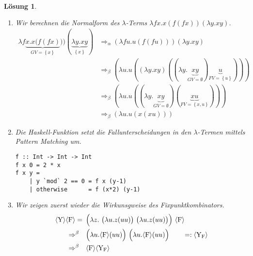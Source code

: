 \documentclass[ngerman,a4paper, 11pt]{scrartcl}
\newcommand{\menge}[1]{\ensuremath{\left\{ #1 \right\}}}
\newcommand{\num}[1]{\ensuremath{\langle \mathrm{#1} \rangle}}
\theoremstyle{break}
\theoremstyle{nonumberplain}
\newtheorem{solution}{Lösung}
\begin{document}
\begin{solution}
	\begin{enumerate}[label=(\alph*), leftmargin=*, nolistsep]
		\item Wir berechnen die Normalform des $\lambda$-Terms $\lambda f x.x(f(fx)) (\lambda y. xy)$.
		\begin{align*}
		\lambda f \underbrace{x.x(f(fx)}_{GV=\menge{x}})) (\underbrace{\lambda y. xy}_{\menge{x}}) 
		&\Rightarrow_\alpha  
		(\lambda f u.u(f(fu))) (\lambda y. xy) \\
		&\Rightarrow_\beta
		(\lambda u.u((\lambda y. xy)((\lambda y. \underbrace{xy}_{GV = \emptyset})\underbrace{u}_{FV = \menge{u}}))) \\
		&\Rightarrow_\beta
		(\lambda u.u((\lambda y. \underbrace{xy}_{GV = \emptyset})(\underbrace{xu}_{FV = \menge{x,u}}) )) \\
		&\Rightarrow_\beta
		(\lambda u . u(x(xu)))
		\end{align*}
		\item Die Haskell-Funktion setzt die Fallunterscheidungen in den $\lambda$-Termen mittels Pattern Matching um.
		
\begin{lstlisting}[style=haskell]
f :: Int -> Int -> Int
f x 0 = 2 * x
f x y = 
	| y `mod` 2 == 0 = f x (y-1)
	| otherwise      = f (x*2) (y-1)
\end{lstlisting}
		
		\item Wir zeigen zuerst wieder die Wirkunsgweise des Fixpunktkombinators.
		\begin{equation*}
		\begin{aligned}
		\num{Y} \num{F}
		= \enskip &\Bigl( \lambda z . \ \bigl( \lambda u . z (uu) \bigr) \ \bigl( \lambda u. z (uu) \bigr) \Bigr) \ \num{F} \\
		\Rightarrow^{\beta} \quad &\Bigl( \lambda u . \num{F} (uu) \Bigr) \ \Bigl( \lambda u. \num{F} (uu) \Bigr) \qquad =: \num{Y_F} \\
		\Rightarrow^{\beta} \quad &\num{F} \num{Y_F}
		\end{aligned}
		\end{equation*}
		

\end{enumerate}
\end{solution}
\end{document}
